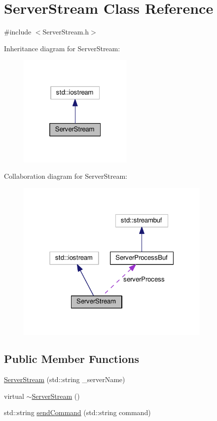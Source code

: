 \hypertarget{class_server_stream}{}\section{Server\+Stream Class Reference}
\label{class_server_stream}


{\ttfamily \#include $<$Server\+Stream.\+h$>$}



Inheritance diagram for Server\+Stream\+:
\nopagebreak
\begin{figure}[H]
\begin{center}
\leavevmode
\includegraphics[width=157pt]{class_server_stream__inherit__graph}
\end{center}
\end{figure}


Collaboration diagram for Server\+Stream\+:
\nopagebreak
\begin{figure}[H]
\begin{center}
\leavevmode
\includegraphics[width=268pt]{class_server_stream__coll__graph}
\end{center}
\end{figure}
\subsection*{Public Member Functions}
\begin{DoxyCompactItemize}
\item 
\hyperlink{class_server_stream_a8797caa637e9637df8b272d32b60b12f}{Server\+Stream} (std\+::string \+\_\+server\+Name)
\item 
virtual \hyperlink{class_server_stream_a8c4904411d6e0f2dc9fc3bdcad9ef154}{$\sim$\+Server\+Stream} ()
\item 
std\+::string \hyperlink{class_server_stream_a191679d705aaa58155e9466d7268ae2a}{send\+Command} (std\+::string command)
\end{DoxyCompactItemize}

